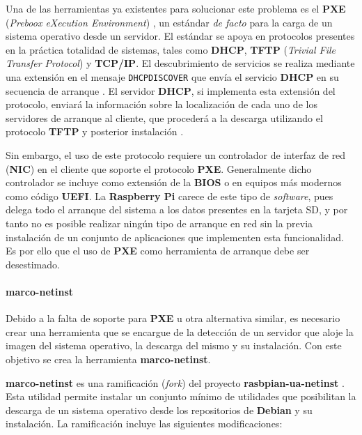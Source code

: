 Una de las herramientas ya existentes para solucionar este problema es el \textbf{PXE} (\textit{Preboox eXecution Environment}) \cite{pxeintel}, un estándar \textit{de facto} \cite{avramov:architecture} para la carga de un sistema operativo desde un servidor. El estándar se apoya en protocolos presentes en la práctica totalidad de sistemas, tales como \textbf{DHCP}, \textbf{TFTP} (\textit{Trivial File Transfer Protocol}) y \textbf{TCP/IP}. El descubrimiento de servicios se realiza mediante una extensión en el mensaje \texttt{DHCPDISCOVER} que envía el servicio \textbf{DHCP} en su secuencia de arranque \cite{rfc4578}. El servidor \textbf{DHCP}, si implementa esta extensión del protocolo, enviará la información sobre la localización de cada uno de los servidores de arranque al cliente, que procederá a la descarga utilizando el protocolo \textbf{TFTP} y posterior instalación \cite{pxeoverview}.

Sin embargo, el uso de este protocolo requiere un controlador de interfaz de red (\textbf{NIC}) en el cliente que soporte el protocolo \textbf{PXE}. Generalmente dicho controlador se incluye como extensión de la \textbf{BIOS} o en equipos más modernos como código \textbf{UEFI}. La \textbf{Raspberry Pi} carece de este tipo de \textit{software}, pues delega todo el arranque del sistema a los datos presentes en la tarjeta SD, y por tanto no es posible realizar ningún tipo de arranque en red sin la previa instalación de un conjunto de aplicaciones que implementen esta funcionalidad. Es por ello que el uso de \textbf{PXE} como herramienta de arranque debe ser desestimado.

\paragraph{marco-netinst\\}

Debido a la falta de soporte para \textbf{PXE} u otra alternativa similar, es necesario crear una herramienta que se encargue de la detección de un servidor que aloje la imagen del sistema operativo, la descarga del mismo y su instalación. Con este objetivo se crea la herramienta \textbf{marco-netinst}.

\textbf{marco-netinst} es una ramificación (\textit{fork}) del proyecto \textbf{rasbpian-ua-netinst} \cite{raspbian-ua-netinst}. Esta utilidad permite instalar un conjunto mínimo de utilidades que posibilitan la descarga de un sistema operativo desde los repositorios de \textbf{Debian} y su instalación. La ramificación incluye las siguientes modificaciones:

